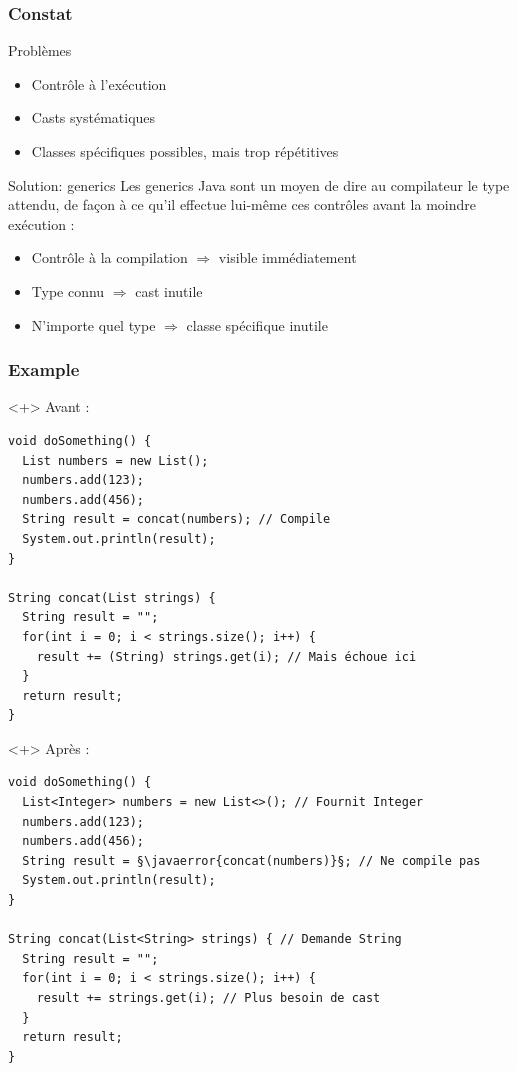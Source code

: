 \documentclass[draft]{beamer}
\makeatletter
\def\uwave{\bgroup\markoverwith{\lower4\p@\hbox{\sixly \textcolor{errorcolor}{\char58}}}\ULon}
\newcommand{\javaerror}[1]{%
  \uwave{#1}%
}
\makeatother
\begin{document}
\begin{frame}
\frametitle{Constat}
\begin{alertblock}{Problèmes}
 \begin{itemize}
  \item Contrôle à l'exécution
  \item Casts systématiques
  \item Classes spécifiques possibles, mais trop répétitives
 \end{itemize}
\end{alertblock}
\begin{exampleblock}{Solution: generics}
 Les generics Java sont un moyen de dire au compilateur le type attendu, de façon à ce qu'il effectue lui-même ces contrôles avant la moindre exécution :
 \begin{itemize}
  \item Contrôle à la compilation $\Rightarrow$ visible immédiatement
  \item Type connu $\Rightarrow$ cast inutile
  \item N'importe quel type $\Rightarrow$ classe spécifique inutile
 \end{itemize}
\end{exampleblock}
\end{frame}

\begin{frame}[fragile]
\frametitle{Example}
\begin{onlyenv}<+>
Avant :
\begin{lstlisting}
void doSomething() {
  List numbers = new List();
  numbers.add(123);
  numbers.add(456);
  String result = concat(numbers); // Compile
  System.out.println(result);
}

String concat(List strings) {
  String result = "";
  for(int i = 0; i < strings.size(); i++) {
    result += (String) strings.get(i); // Mais échoue ici
  }
  return result;
}
\end{lstlisting}
\end{onlyenv}
\begin{onlyenv}<+>
Après :
\begin{lstlisting}
void doSomething() {
  List<Integer> numbers = new List<>(); // Fournit Integer
  numbers.add(123);
  numbers.add(456);
  String result = §\javaerror{concat(numbers)}§; // Ne compile pas
  System.out.println(result);
}

String concat(List<String> strings) { // Demande String
  String result = "";
  for(int i = 0; i < strings.size(); i++) {
    result += strings.get(i); // Plus besoin de cast
  }
  return result;
}
\end{lstlisting}
\end{onlyenv}
\end{frame}
\end{document}
